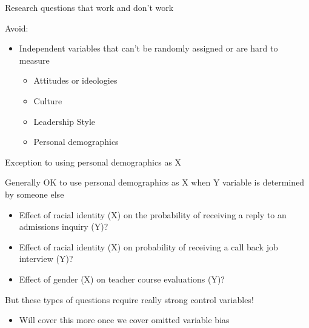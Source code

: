 \documentclass[
  8pt,
  ignorenonframetext,
  dvipsnames]{beamer}
\providecommand{\tightlist}{%
  \setlength{\itemsep}{0pt}\setlength{\parskip}{0pt}}
\let\olditem\item
\renewcommand{\item}{%
  \olditem\vspace{4pt}
}
\begin{document}
\begin{frame}{Research questions that work and don't work}
\medskip

Avoid:

\begin{itemize}
\tightlist
\item
  Independent variables that can't be randomly assigned or are hard to
  measure

  \begin{itemize}
  \tightlist
  \item
    Attitudes or ideologies
  \item
    Culture
  \item
    Leadership Style
  \item
    Personal demographics
  \end{itemize}
\end{itemize}

\end{frame}

\begin{frame}{Exception to using personal demographics as X}
\protect\hypertarget{exception-to-using-personal-demographics-as-x}{}

Generally OK to use personal demographics as X when Y variable is
determined by someone else

\begin{itemize}
\tightlist
\item
  Effect of racial identity (X) on the probability of receiving a reply
  to an admissions inquiry (Y)?
\item
  Effect of racial identity (X) on probability of receiving a call back
  job interview (Y)?
\item
  Effect of gender (X) on teacher course evaluations (Y)?
\end{itemize}

\medskip

But these types of questions require really strong control variables!

\begin{itemize}
\tightlist
\item
  Will cover this more once we cover omitted variable bias
\end{itemize}

\end{frame}
\end{document}
